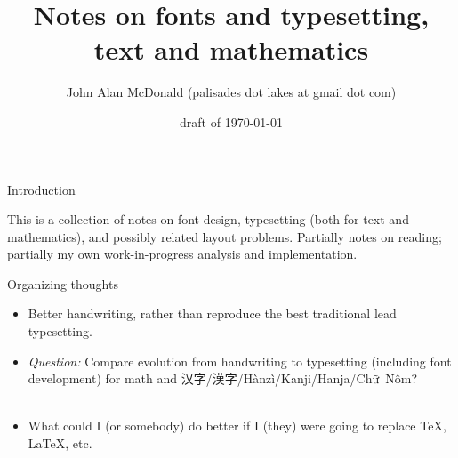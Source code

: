 \documentclass[12pt]{PalisadesLakesBook}
\title{Notes on fonts and typesetting, text and mathematics}
\author{John Alan McDonald 
(palisades dot lakes at gmail dot com)}
\date{draft of \today}
\begin{document}
\maketitle
{}
\def\sharedFolder{../../shared/}
\begin{plSection}{Introduction}

This is a collection of notes on font design,
typesetting (both for text and mathematics),
and possibly related layout problems. 
Partially notes on reading; 
partially my own work-in-progress analysis and implementation.
\begin{plSection}{Organizing thoughts}

\begin{itemize}

\item Better handwriting, rather than reproduce the best
traditional lead typesetting.

\item \emph{Question:} Compare evolution from handwriting to 
typesetting (including font development) for
math and 
汉字/\allowbreak 漢字/\allowbreak Hànzì/\allowbreak Kanji/\allowbreak Hanja/\allowbreak \mbox{Chữ Nôm}?\\
\\
 
\item What could I (or somebody) do better
if I (they) were going to replace \TeX, \LaTeX, etc.


\end{itemize}
\end{plSection}%
\end{plSection}%
\end{document}
